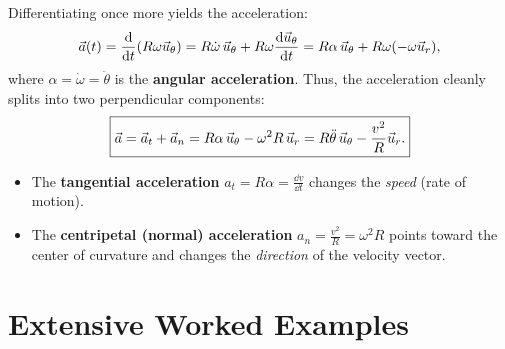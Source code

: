 Differentiating once more yields the acceleration:
\[
\vec{a}(t) = \frac{\mathrm{d}}{\mathrm{d} t}(R\omega\vec{u}_\theta) = R\dot{\omega}\,\vec{u}_\theta + R\omega\frac{\mathrm{d}\vec{u}_\theta}{\mathrm{d} t} = R\alpha\,\vec{u}_\theta + R\omega(-\omega\vec{u}_r),
\]
where $\alpha = \dot{\omega} = \ddot{\theta}$ is the \textbf{angular acceleration}.
Thus, the acceleration cleanly splits into two perpendicular components:
\[
\boxed{\vec{a} = \vec{a}_t + \vec{a}_n = R\alpha\,\vec{u}_\theta - \omega^2 R\,\vec{u}_r = R\ddot{\theta}\,\vec{u}_\theta - \frac{v^2}{R}\vec{u}_r.}
\]
\begin{itemize}[leftmargin=1.4em,itemsep=2pt]
  \item The \textbf{tangential acceleration} $a_t = R\alpha = \frac{\dd v}{\dd t}$ changes the \emph{speed} (rate of motion).
  \item The \textbf{centripetal (normal) acceleration} $a_n = \frac{v^2}{R} = \omega^2 R$ points toward the center of curvature and changes the \emph{direction} of the velocity vector.
\end{itemize}

\section{Extensive Worked Examples}

